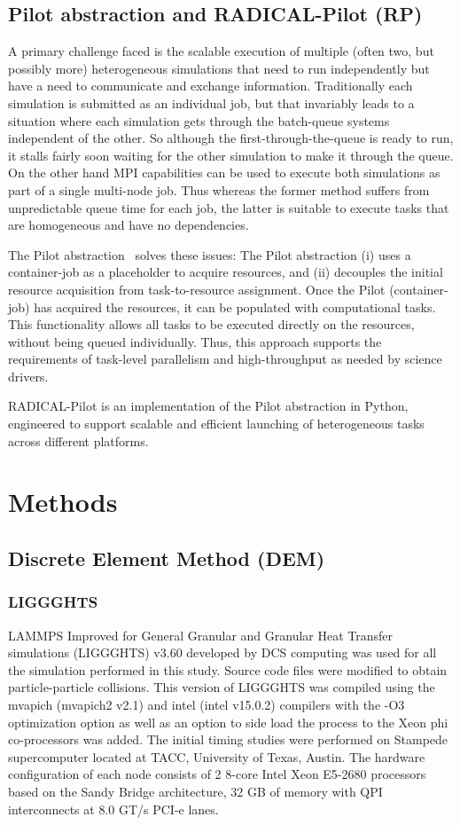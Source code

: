 \documentclass[preprint,11pt,authoryear]{elsarticle}
\begin{document}
\subsection{Pilot abstraction and RADICAL-Pilot (RP)}
A primary challenge faced is the scalable execution of multiple (often two,
but possibly more) heterogeneous simulations that need to run independently
but have a need to communicate and exchange information. Traditionally each
simulation is submitted as an individual job, but that invariably leads
to a situation where each simulation gets through the batch-queue systems
independent of the other. So although the first-through-the-queue is ready to
run, it stalls fairly soon waiting for the other simulation to make it through
the queue.  On the other hand MPI capabilities can be used to  execute both
simulations as part of a single multi-node job.  Thus whereas the former
method suffers from unpredictable queue time for each job, the latter is
suitable to execute tasks that are homogeneous and have no dependencies.


The Pilot abstraction~\citep{pstar12} solves these issues:  The Pilot abstraction 
(i) uses a container-job as a placeholder to acquire resources, and (ii) decouples 
the initial resource acquisition from task-to-resource assignment. Once the 
Pilot (container-job) has acquired the resources, it can be populated with 
computational tasks. This functionality allows all tasks to be executed directly 
on the resources, without being queued individually. Thus, this approach supports 
the requirements of task-level parallelism and high-throughput as needed by 
science drivers.


RADICAL-Pilot is an implementation of the Pilot abstraction in Python, engineered to
support scalable and efficient launching of heterogeneous tasks across different platforms.
\section{Methods}

\subsection{Discrete Element Method (DEM)}
\subsubsection{LIGGGHTS}
LAMMPS Improved for General Granular and Granular Heat Transfer simulations (LIGGGHTS) v3.60 
developed by DCS computing was used for all the simulation performed in this study. 
Source code files were modified to obtain particle-particle 
collisions. This version of LIGGGHTS was compiled using the mvapich (mvapich2 v2.1) 
and intel (intel v15.0.2) compilers with the -O3 optimization option as well as an option to side load the 
process to the Xeon phi co-processors was added. The initial timing studies were performed on Stampede 
supercomputer located at TACC, University of Texas, Austin. The hardware configuration of each node 
consists of 2 8-core Intel Xeon E5-2680 processors based on the Sandy Bridge architecture, 32 GB of 
memory with QPI interconnects at 8.0 GT/s PCI-e lanes.
\end{document}
